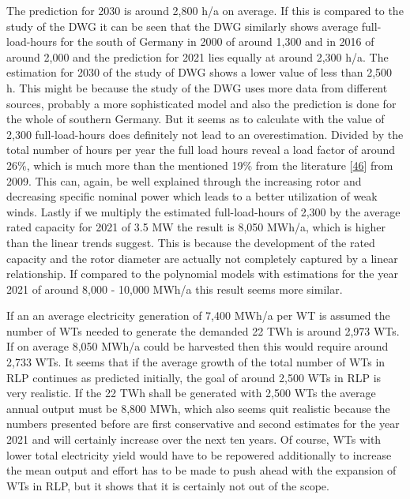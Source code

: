 \documentclass[a4paper,11pt]{article}
\begin{document}
The prediction for 2030 is around 2,800 h/a on average. If this is compared to the study of the DWG it can be seen that the DWG similarly shows average full-load-hours for the south of Germany in 2000 of around 1,300 and in 2016 of around 2,000 and the prediction for 2021 lies equally at around 2,300 h/a. The estimation for 2030 of the study of DWG shows a lower value of less than 2,500 h. This might be because the study of the DWG uses more data from different sources, probably a more sophisticated model and also the prediction is done for the whole of southern Germany. But it seems as to calculate with the value of 2,300 full-load-hours does definitely not lead to an overestimation. Divided by the total number of hours per year the full load hours reveal a load factor of around 26\%, which is much more than the mentioned 19\% from the literature {[}\protect\hyperlink{ref-DavidJCMacKay.2009}{46}{]} from 2009. This can, again, be well explained through the increasing rotor and decreasing specific nominal power which leads to a better utilization of weak winds. Lastly if we multiply the estimated full-load-hours of 2,300 by the average rated capacity for 2021 of 3.5 MW the result is 8,050 MWh/a, which is higher than the linear trends suggest. This is because the development of the rated capacity and the rotor diameter are actually not completely captured by a linear relationship. If compared to the polynomial models with estimations for the year 2021 of around 8,000 - 10,000 MWh/a this result seems more similar.

If an an average electricity generation of 7,400 MWh/a per WT is assumed the number of WTs needed to generate the demanded 22 TWh is around 2,973 WTs. If on average 8,050 MWh/a could be harvested then this would require around 2,733 WTs. It seems that if the average growth of the total number of WTs in RLP continues as predicted initially, the goal of around 2,500 WTs in RLP is very realistic. If the 22 TWh shall be generated with 2,500 WTs the average annual output must be 8,800 MWh, which also seems quit realistic because the numbers presented before are first conservative and second estimates for the year 2021 and will certainly increase over the next ten years. Of course, WTs with lower total electricity yield would have to be repowered additionally to increase the mean output and effort has to be made to push ahead with the expansion of WTs in RLP, but it shows that it is certainly not out of the scope.
\end{document}
